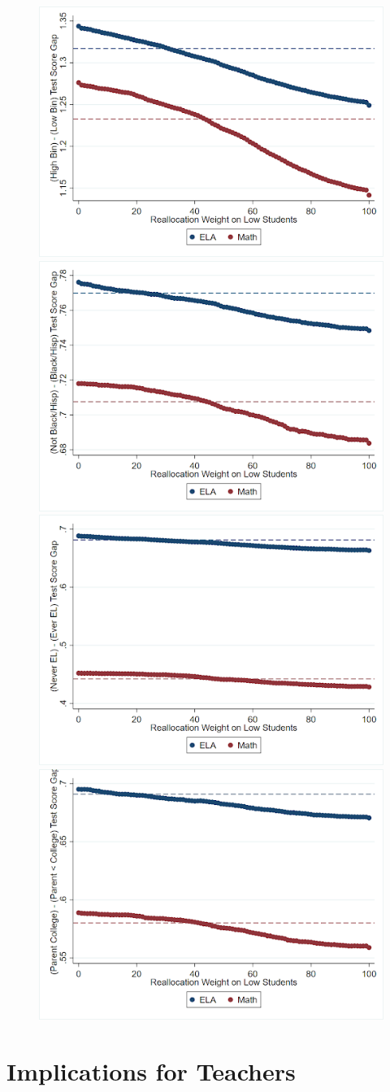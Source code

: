 \documentclass{article}
\theoremstyle{definition}
\theoremstyle{definition}
\theoremstyle{definition}
\theoremstyle{definition}
\begin{document}
 \begin{figure}[H]
    \centering
    \includegraphics[width=.45\textwidth]{Working_Paper/WP_Figures/test_score_gaps.png}
    \includegraphics[width=.45\textwidth]{Working_Paper/WP_Figures/race_gaps.png}
        \includegraphics[width=.45\textwidth]{Working_Paper/WP_Figures/ela_gaps.png}
    \includegraphics[width=.45\textwidth]{Working_Paper/WP_Figures/college_parent_gap.png}
\end{figure}


\section{Implications for Teachers} \label{twell}
\end{document}
